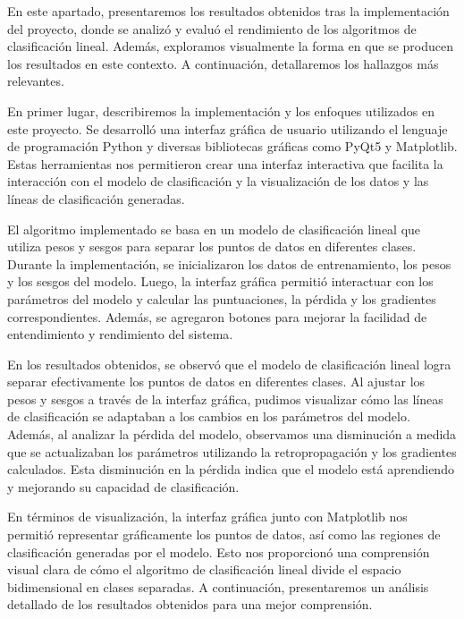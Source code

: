 \documentclass[twoside,10pt]{article}
\numberwithin{equation}{section}
\begin{document}
En este apartado, presentaremos los resultados obtenidos tras la implementación del proyecto, donde se analizó y evaluó el rendimiento de los algoritmos de clasificación lineal. Además, exploramos visualmente la forma en que se producen los resultados en este contexto. A continuación, detallaremos los hallazgos más relevantes.

En primer lugar, describiremos la implementación y los enfoques utilizados en este proyecto. Se desarrolló una interfaz gráfica de usuario utilizando el lenguaje de programación Python y diversas bibliotecas gráficas como PyQt5 y Matplotlib. Estas herramientas nos permitieron crear una interfaz interactiva que facilita la interacción con el modelo de clasificación y la visualización de los datos y las líneas de clasificación generadas.

El algoritmo implementado se basa en un modelo de clasificación lineal que utiliza pesos y sesgos para separar los puntos de datos en diferentes clases. Durante la implementación, se inicializaron los datos de entrenamiento, los pesos y los sesgos del modelo. Luego, la interfaz gráfica permitió interactuar con los parámetros del modelo y calcular las puntuaciones, la pérdida y los gradientes correspondientes. Además, se agregaron botones para mejorar la facilidad de entendimiento y rendimiento del sistema.

En los resultados obtenidos, se observó que el modelo de clasificación lineal logra separar efectivamente los puntos de datos en diferentes clases. Al ajustar los pesos y sesgos a través de la interfaz gráfica, pudimos visualizar cómo las líneas de clasificación se adaptaban a los cambios en los parámetros del modelo. Además, al analizar la pérdida del modelo, observamos una disminución a medida que se actualizaban los parámetros utilizando la retropropagación y los gradientes calculados. Esta disminución en la pérdida indica que el modelo está aprendiendo y mejorando su capacidad de clasificación.

En términos de visualización, la interfaz gráfica junto con Matplotlib nos permitió representar gráficamente los puntos de datos, así como las regiones de clasificación generadas por el modelo. Esto nos proporcionó una comprensión visual clara de cómo el algoritmo de clasificación lineal divide el espacio bidimensional en clases separadas. A continuación, presentaremos un análisis detallado de los resultados obtenidos para una mejor comprensión.
\end{document}
